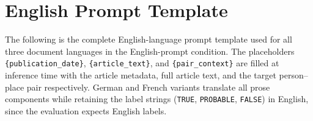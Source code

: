 \documentclass[
]{ceurart}
\theoremstyle{definition}
\begin{document}
\section{English Prompt Template}
\label{app:prompt}

The following is the complete English-language prompt template used for all three document languages in the English-prompt condition.
The placeholders \texttt{\{publication\_date\}}, \texttt{\{article\_text\}}, and \texttt{\{pair\_context\}} are filled at inference time with the article metadata, full article text, and the target person--place pair respectively.
German and French variants translate all prose components while retaining the label strings (\texttt{TRUE}, \texttt{PROBABLE}, \texttt{FALSE}) in English, since the evaluation expects English labels.

\lstset{
  basicstyle=\ttfamily\scriptsize,
  breaklines=true,
  frame=single,
  framerule=0.4pt,
  xleftmargin=0.5em,
  xrightmargin=0.5em,
}
\end{document}
